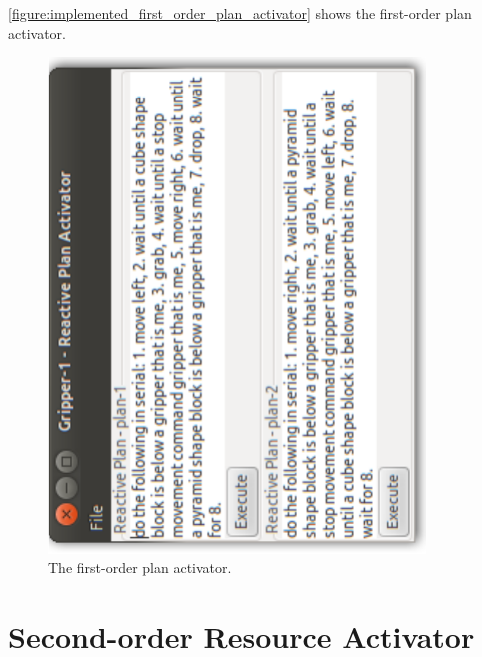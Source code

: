 {\mbox{\autoref{figure:implemented_first_order_plan_activator}}} shows
the first-order plan activator.
\begin{figure}
\begin{center}
\includegraphics[width=10cm]{gfx/implemented_first_order_plan_activator}
\end{center}
\caption[The first-order plan activator.]{The first-order plan
  activator.}
\label{figure:implemented_first_order_plan_activator}
\end{figure}

\section{Second-order Resource Activator}


